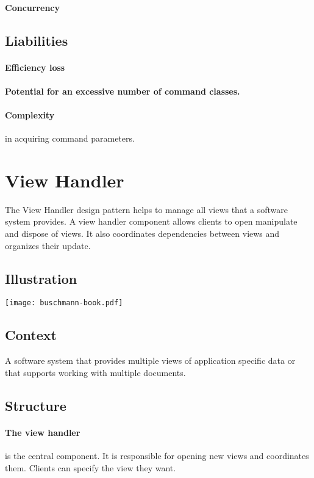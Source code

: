 \documentclass[a4paper,11pt,twocolumn]{report}
\begin{document}
    \paragraph{Concurrency}
    \subsection{Liabilities}
    \paragraph{Efficiency loss}
    \paragraph{Potential for an excessive number of command classes.}
    \paragraph{Complexity} in acquiring command parameters.


    \section{View Handler}
    The View Handler design pattern helps to manage all views that a software
    system provides. A view handler component allows clients to open manipulate
    and dispose of views. It also coordinates dependencies between views and
    organizes their update.
    \subsection{Illustration}
    \texttt{[image: buschmann-book.pdf]}
    \subsection{Context}
    A software system that provides multiple views of application specific data
    or that supports working with multiple documents.
    \subsection{Structure}
    \paragraph{The view handler} is the central component. It is responsible
    for opening new views and coordinates them. Clients can specify the view 
    they want.
\end{document}
